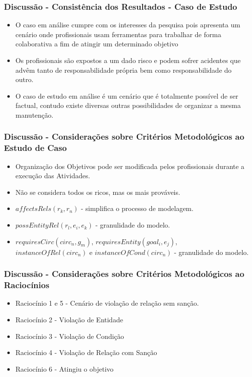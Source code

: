 \documentclass{beamer}
\begin{document}
\begin{frame}
	\frametitle{Discussão - Consistência dos Resultados - Caso de Estudo}
	\begin{itemize}
		\item  O caso em análise cumpre com os interesses da pesquisa pois apresenta um cenário onde profissionais usam ferramentas para trabalhar de forma colaborativa a fim de atingir um determinado objetivo
		\item Os profissionais são expostos a um dado risco e podem sofrer acidentes que advêm tanto de responsabilidade própria bem como responsabilidade do outro.
		\item O caso de estudo em análise é um cenário que é totalmente possível de ser factual, contudo existe diversas outras possibilidades de organizar a mesma manutenção.
	\end{itemize}
\end{frame}

\begin{frame}
	\frametitle{Discussão - Considerações sobre Critérios Metodológicos ao Estudo de Caso}
	\begin{itemize}
		\item Organização dos Objetivos pode ser modificada pelos profissionais durante a execução das Atividades.		
		\item Não se considera todos os ricos, mas os mais prováveis.
		\item $affectsRels(r_k,r_n)$ - simplifica o processo de modelagem.
		\item $possEntityRel(r_l,e_i,e_k)$ - granulidade do modelo.
		\item $requiresCirc(circ_n,g_m)$, $requiresEntity(goal_i, e_j)$, $instanceOfRel(circ_n)$ e $instanceOfCond(circ_n)$ - granulidade do modelo. 
	\end{itemize}
\end{frame}

\begin{frame}
	\frametitle{Discussão - Considerações sobre Critérios Metodológicos ao Raciocínios}
	\begin{itemize}
		\item Raciocínio 1 e 5  - Cenário de violação de relação sem sanção.  
		\item Raciocínio 2 - Violação de Entidade 
		\item Raciocínio 3 - Violação de Condição
		\item Raciocínio 4 - Violação de Relação com Sanção
		\item Raciocínio 6 - Atingiu o objetivo
	\end{itemize}
\end{frame}
\end{document}
